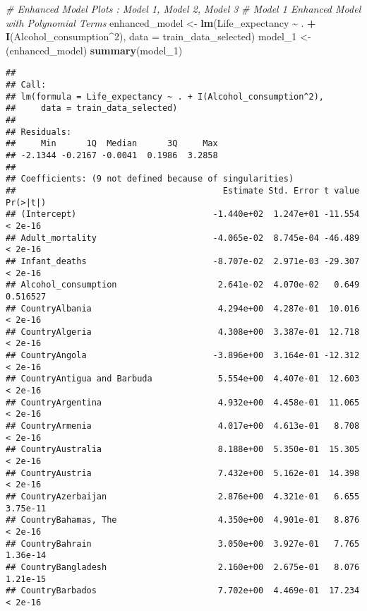 \documentclass[
]{article}
\newenvironment{Shaded}{\begin{snugshade}}{\end{snugshade}}
\newcommand{\AttributeTok}[1]{\textcolor[rgb]{0.13,0.29,0.53}{#1}}
\newcommand{\CommentTok}[1]{\textcolor[rgb]{0.56,0.35,0.01}{\textit{#1}}}
\newcommand{\DecValTok}[1]{\textcolor[rgb]{0.00,0.00,0.81}{#1}}
\newcommand{\FunctionTok}[1]{\textcolor[rgb]{0.13,0.29,0.53}{\textbf{#1}}}
\newcommand{\NormalTok}[1]{#1}
\newcommand{\OtherTok}[1]{\textcolor[rgb]{0.56,0.35,0.01}{#1}}
\newcommand{\SpecialCharTok}[1]{\textcolor[rgb]{0.81,0.36,0.00}{\textbf{#1}}}
\begin{document}
\begin{Shaded}
\begin{Highlighting}[]
\CommentTok{\# Enhanced Model Plots : Model 1, Model 2, Model 3}
\CommentTok{\# Model 1  Enhanced Model with Polynomial Terms}
\NormalTok{enhanced\_model }\OtherTok{\textless{}{-}} \FunctionTok{lm}\NormalTok{(Life\_expectancy }\SpecialCharTok{\textasciitilde{}}\NormalTok{ . }\SpecialCharTok{+} \FunctionTok{I}\NormalTok{(Alcohol\_consumption}\SpecialCharTok{\^{}}\DecValTok{2}\NormalTok{), }\AttributeTok{data =}\NormalTok{ train\_data\_selected)}
\NormalTok{model\_1 }\OtherTok{\textless{}{-}}\NormalTok{ (enhanced\_model)}
\FunctionTok{summary}\NormalTok{(model\_1)}
\end{Highlighting}
\end{Shaded}

\begin{verbatim}
## 
## Call:
## lm(formula = Life_expectancy ~ . + I(Alcohol_consumption^2), 
##     data = train_data_selected)
## 
## Residuals:
##     Min      1Q  Median      3Q     Max 
## -2.1344 -0.2167 -0.0041  0.1986  3.2858 
## 
## Coefficients: (9 not defined because of singularities)
##                                         Estimate Std. Error t value Pr(>|t|)
## (Intercept)                           -1.440e+02  1.247e+01 -11.554  < 2e-16
## Adult_mortality                       -4.065e-02  8.745e-04 -46.489  < 2e-16
## Infant_deaths                         -8.707e-02  2.971e-03 -29.307  < 2e-16
## Alcohol_consumption                    2.641e-02  4.070e-02   0.649 0.516527
## CountryAlbania                         4.294e+00  4.287e-01  10.016  < 2e-16
## CountryAlgeria                         4.308e+00  3.387e-01  12.718  < 2e-16
## CountryAngola                         -3.896e+00  3.164e-01 -12.312  < 2e-16
## CountryAntigua and Barbuda             5.554e+00  4.407e-01  12.603  < 2e-16
## CountryArgentina                       4.932e+00  4.458e-01  11.065  < 2e-16
## CountryArmenia                         4.017e+00  4.613e-01   8.708  < 2e-16
## CountryAustralia                       8.188e+00  5.350e-01  15.305  < 2e-16
## CountryAustria                         7.432e+00  5.162e-01  14.398  < 2e-16
## CountryAzerbaijan                      2.876e+00  4.321e-01   6.655 3.75e-11
## CountryBahamas, The                    4.350e+00  4.901e-01   8.876  < 2e-16
## CountryBahrain                         3.050e+00  3.927e-01   7.765 1.36e-14
## CountryBangladesh                      2.160e+00  2.675e-01   8.076 1.21e-15
## CountryBarbados                        7.702e+00  4.469e-01  17.234  < 2e-16

\end{verbatim}
\end{document}
